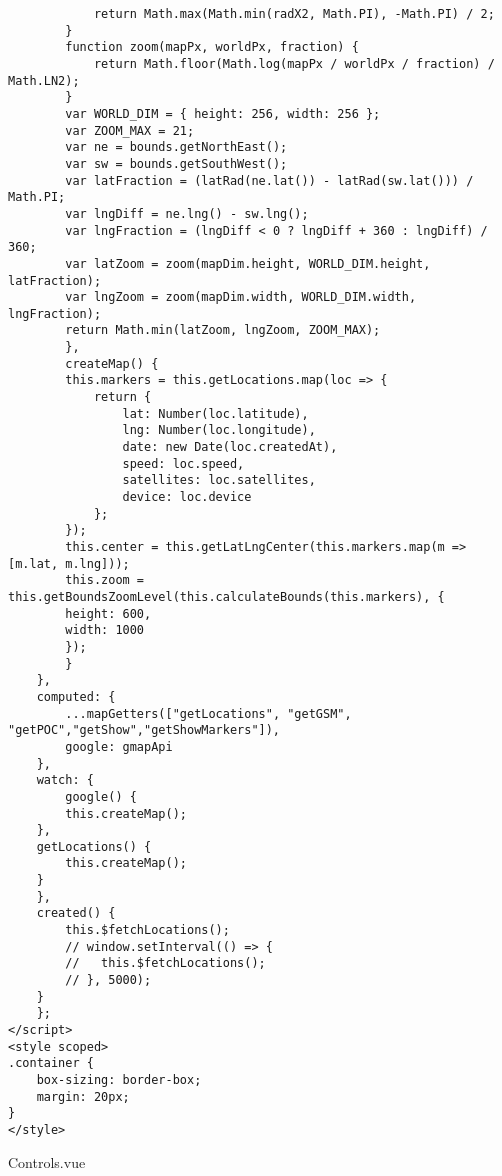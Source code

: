 \begin{lstlisting}
			return Math.max(Math.min(radX2, Math.PI), -Math.PI) / 2;
		}
		function zoom(mapPx, worldPx, fraction) {
			return Math.floor(Math.log(mapPx / worldPx / fraction) / Math.LN2);
		}
		var WORLD_DIM = { height: 256, width: 256 };
		var ZOOM_MAX = 21;
		var ne = bounds.getNorthEast();
		var sw = bounds.getSouthWest();
		var latFraction = (latRad(ne.lat()) - latRad(sw.lat())) / Math.PI;
		var lngDiff = ne.lng() - sw.lng();
		var lngFraction = (lngDiff < 0 ? lngDiff + 360 : lngDiff) / 360;
		var latZoom = zoom(mapDim.height, WORLD_DIM.height, latFraction);
		var lngZoom = zoom(mapDim.width, WORLD_DIM.width, lngFraction);
		return Math.min(latZoom, lngZoom, ZOOM_MAX);
		},
		createMap() {
		this.markers = this.getLocations.map(loc => {
			return {
				lat: Number(loc.latitude),
				lng: Number(loc.longitude),
				date: new Date(loc.createdAt),
				speed: loc.speed,
				satellites: loc.satellites,
				device: loc.device
			};
		});
		this.center = this.getLatLngCenter(this.markers.map(m => [m.lat, m.lng]));
		this.zoom = this.getBoundsZoomLevel(this.calculateBounds(this.markers), {
		height: 600,
		width: 1000
		});
		}
	},
	computed: {
		...mapGetters(["getLocations", "getGSM", "getPOC","getShow","getShowMarkers"]),
		google: gmapApi
	},
	watch: {
		google() {
		this.createMap();
	},
	getLocations() {
		this.createMap();
	}
	},
	created() {
		this.$fetchLocations();
		// window.setInterval(() => {
		//   this.$fetchLocations();
		// }, 5000);
	}
	};
</script>
<style scoped>
.container {
	box-sizing: border-box;
	margin: 20px;
}
</style>
\end{lstlisting}
Controls.vue

